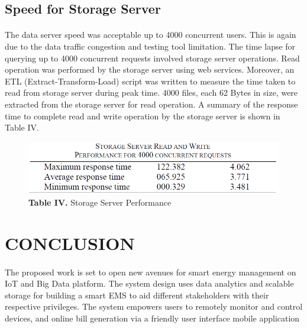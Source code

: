\documentclass[a4paper,12pt,oneside]{article}
\let\counterwithin\relax
\begin{document}
\newpage
\subsection{Speed for Storage Server}
\paragraph{}
The data server speed was acceptable up to 4000 concurrent
users. This is again due to the data traffic congestion and
testing tool limitation. The time lapse for querying up to 4000
concurrent requests involved storage server operations. Read
operation was performed by the storage server using web
services. Moreover, an ETL (Extract-Transform-Load) script
was written to measure the time taken to read from storage
server during peak time. 4000 files, each 62 Bytes in size,
were extracted from the storage server for read operation. A
summary of the response time to complete read and write
operation by the storage server is shown in Table IV.
    \begin{figure}[H]
    \includegraphics{Table4.png}
    \centering
    \caption{\textbf{Table IV.} Storage Server Performance}
    \end{figure}

\newpage
\section{CONCLUSION}
\paragraph{}
The proposed work is set to open new avenues for smart
energy management on IoT and Big Data platform. The
system design uses data analytics and scalable storage for
building a smart EMS to aid different stakeholders with their
respective privileges. The system empowers users to remotely
monitor and control devices, and online bill generation via a
friendly user interface mobile application

\newpage
\end{document}
